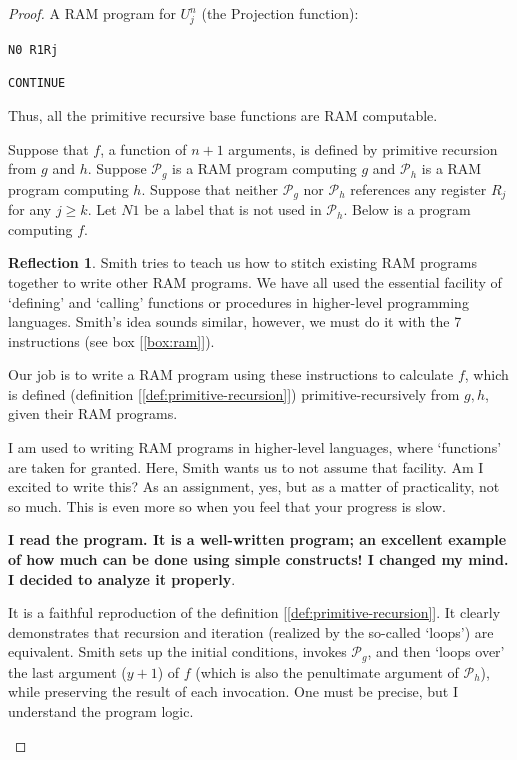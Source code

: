 \documentclass[11pt]{book}
\theoremstyle{definition}
\theoremstyle{plain}
\theoremstyle{problemstyle}
\theoremstyle{remark}
\theoremstyle{definition}
\newtheorem{reflection}{Reflection}
\begin{document}
\begin{proof}
    A RAM program for $U_j^{n}$ (the Projection function):

    \texttt{N0 R1\leftarrow Rj}

    \texttt{\quad CONTINUE}


    Thus, all the primitive recursive base functions are RAM computable.


    Suppose that $f$, a function of $n+1$ arguments, is defined by primitive recursion from $g$ and $h$. Suppose $\mathcal{P}_g$ is a RAM program computing $g$ and $\mathcal{P}_h$ is a RAM program computing $h$. Suppose that neither $\mathcal{P}_g$ nor $\mathcal{P}_h$ references any register $R_j$ for any $j\geq k$. Let $N1$ be a label that is not used in $\mathcal{P}_h$. Below is a program computing $f$.

    \begin{reflection}
        Smith tries to teach us how to stitch existing RAM programs together to write other RAM programs. We have all used the essential facility of `defining' and `calling' functions or procedures in higher-level programming languages. Smith's idea sounds similar, however, we must do it with the 7 instructions (see box [\ref{box:ram}]).

        Our job is to write a RAM program using these instructions to calculate $f$, which is defined (definition [\ref{def:primitive-recursion}]) primitive-recursively from $g,h$, given their RAM programs.

        I am used to writing RAM programs in higher-level languages, where `functions' are taken for granted. Here, Smith wants us to not assume that facility. Am I excited to write this? As an assignment, yes, but as a matter of practicality, not so much. This is even more so when you feel that your progress is slow.


        \textbf{I read the program. It is a well-written program; an excellent example of how much can be done using simple constructs! I changed my mind. I decided to analyze it properly}.

        It is a faithful reproduction of the definition [\ref{def:primitive-recursion}]. It clearly demonstrates that recursion and iteration (realized by the so-called `loops') are equivalent. Smith sets up the initial conditions, invokes $\mathcal{P}_g$, and then `loops over' the last argument ($y+1$) of $f$ (which is also the penultimate argument of $\mathcal{P}_h$), while preserving the result of each invocation. One must be precise, but I understand the program logic.


\end{reflection}
\end{proof}
\end{document}
